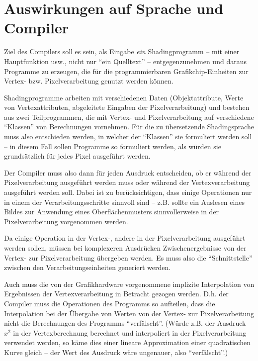\documentclass[twoside,a4paper,fleqn,12pt]{book}
\begin{document}
\section{Auswirkungen auf Sprache und Compiler}

Ziel des Compilers soll es sein, als Eingabe \emph{ein} Shadingprogramm -- mit einer Hauptfunktion usw., nicht nur "`ein Quelltext"' -- entgegenzunehmen
und daraus Programme zu erzeugen, die für die programmierbaren Grafikchip-Einheiten zur Vertex- bzw. Pixelverarbeitung genutzt werden können.

Shadingprogramme arbeiten mit verschiedenen Daten (Objektattribute, Werte von Vertexattributen, abgeleitete Eingaben der Pixelverarbeitung)
und bestehen aus zwei Teilprogrammen, die mit Vertex- und Pixelverarbeitung auf verschiedene "`Klassen"' von Berechnungen vornehmen.
Für die zu übersetzende Shadingsprache muss also entschieden werden, in welcher der "`Klassen"' sie formuliert werden soll --
in diesem Fall sollen Programme so formuliert werden, als würden sie grundsätzlich für jedes Pixel ausgeführt werden.


Der Compiler muss also dann für jeden Ausdruck entscheiden, ob er während der Pixelverarbeitung ausgeführt werden muss
oder während der Vertexverarbeitung ausgeführt werden soll.
Dabei ist zu berücksichtigen, dass einige Operationen nur in einem der Verarbeitungsschritte sinnvoll sind -- z.B. sollte ein Auslesen
eines Bildes zur Anwendung eines Oberflächenmusters sinnvollerweise in der Pixelverarbeitung vorgenommen werden.

Da einige Operation in der Vertex-, andere in der Pixelverarbeitung ausgeführt werden sollen, müssen bei komplexeren
Ausdrücken Zwischenergebnisse von der Vertex- zur Pixelverarbeitung übergeben werden. Es muss also die "`Schnittstelle"'
zwischen den Verarbeitungseinheiten generiert werden.

Auch muss die von der Grafikhardware vorgenommene implizite Interpolation von Ergebnissen der Vertexverarbeitung in Betracht
gezogen werden. D.h. der Compiler muss die Operationen des Programms so aufteilen, dass die Interpolation bei der Übergabe
von Werten von der Vertex- zur Pixelverarbeitung nicht die Berechnungen des Programms "`verfälscht"'. (Würde z.B. der Ausdruck 
$x^2$ in der Vertexberechnung berechnet und interpoliert in der Pixelverarbeitung verwendet werden, so käme dies einer
lineare Approximation einer quadratischen Kurve gleich -- der Wert des Ausdruck wäre ungenauer, also "`verfälscht"'.)
\end{document}
